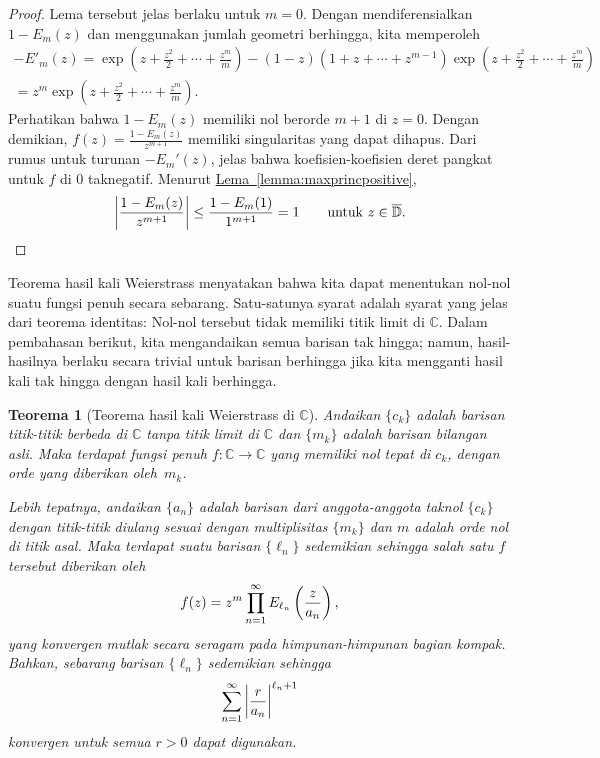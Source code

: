 \documentclass[12pt,openany]{book}
\newcommand{\avoidbreak}{\postdisplaypenalty=100}
\newcommand{\abs}[1]{\left\lvert {#1} \right\rvert}
\newcommand{\C}{{\mathbb{C}}}
\newcommand{\D}{{\mathbb{D}}}
\theoremstyle{plain}
\newtheorem{thm}{Teorema}[section]
\theoremstyle{remark}
\theoremstyle{definition}
\theoremstyle{exercise}
\theoremstyle{example}
\newcommand{\lemmaref}[1]{\hyperref[#1]{Lema~\ref*{#1}}}
\begin{document}
\begin{proof}
Lema tersebut jelas berlaku untuk $m=0$.
Dengan mendiferensialkan $1-E_m(z)$ dan menggunakan jumlah geometri berhingga, kita memperoleh
\begin{multline*}
-E'_m(z) =
\exp\left( z +\frac{z^2}{2} + \cdots + \frac{z^m}{m} \right)
-
(1-z) (1 +z  + \cdots + z^{m-1} ) \exp\left( z +\frac{z^2}{2} + \cdots + \frac{z^m}{m} \right)
\\
=
z^m \exp\left( z +\frac{z^2}{2} + \cdots + \frac{z^m}{m} \right) .
\end{multline*}
Perhatikan bahwa $1-E_m(z)$ memiliki nol berorde $m+1$ di $z=0$.  Dengan demikian, $f(z) =
\frac{1-E_m(z)}{z^{m+1}}$ memiliki singularitas yang dapat dihapus.  Dari rumus untuk
turunan $-E_m'(z)$, jelas bahwa koefisien-koefisien deret pangkat
untuk $f$ di $0$ taknegatif.  Menurut \lemmaref{lemma:maxprincpositive},
\begin{equation*}
\abs{\frac{1-E_m(z)}{z^{m+1}}} \leq
\frac{1-E_m(1)}{1^{m+1}} = 1
\qquad \text{untuk $z \in \overline{\D}$}.  \qedhere
\end{equation*}
\end{proof}

Teorema hasil kali Weierstrass menyatakan bahwa
kita dapat menentukan nol-nol suatu fungsi penuh secara sebarang.
Satu-satunya syarat adalah syarat yang jelas dari teorema identitas:
Nol-nol tersebut tidak memiliki titik limit di $\C$.
Dalam pembahasan berikut, kita mengandaikan semua barisan tak hingga; namun,
hasil-hasilnya berlaku secara trivial untuk barisan berhingga jika kita mengganti hasil kali tak hingga
dengan hasil kali berhingga.

\begin{thm}[Teorema hasil kali Weierstrass di $\C$]
\index{teorema hasil kali Weierstrass di $\C$}
\pagebreak[3]
Andaikan $\{ c_k \}$ adalah barisan titik-titik berbeda di $\C$
tanpa titik limit di $\C$ dan $\{ m_k \}$ adalah barisan
bilangan asli.
Maka terdapat fungsi penuh $f \colon \C \to \C$ yang
memiliki nol tepat di $c_k$, dengan orde yang diberikan oleh~$m_k$.

Lebih tepatnya, andaikan $\{ a_n \}$ adalah barisan dari anggota-anggota taknol $\{ c_k \}$ dengan titik-titik
diulang sesuai dengan multiplisitas $\{ m_k \}$ dan $m$
adalah orde nol di titik asal.
Maka terdapat suatu
barisan $\{ \ell_n \}$ sedemikian sehingga salah satu $f$ tersebut diberikan oleh
\begin{equation*}
f(z) = z^m \prod_{n=1}^\infty E_{\ell_n}\left(\frac{z}{a_n}\right) ,
\avoidbreak
\end{equation*}
yang konvergen mutlak secara seragam pada himpunan-himpunan bagian kompak.
Bahkan, sebarang barisan $\{ \ell_n \}$ sedemikian sehingga
\begin{equation} \label{eq:pnconvergence}
\sum_{n=1}^\infty {\abs{\frac{r}{a_n}}}^{\ell_n+1}
\avoidbreak
\end{equation}
konvergen untuk semua $r > 0$ dapat digunakan.
\end{thm}
\end{document}
